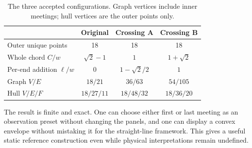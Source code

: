 \documentclass[11pt,a4paper]{article}
\begin{document}
\begin{table}[ht]\centering
\caption{The three accepted configurations. Graph vertices include inner meetings; hull vertices are the outer points only.}\label{tab:overview}
\begin{tabular}{@{}lccc@{}}\toprule
 & Original & Crossing A & Crossing B\\\midrule
Outer unique points &18&18&18\\
Whole chord $C/w$ &$\sqrt2-1$&$1$&$1+\sqrt2$\\
Per-end addition $\ell/w$ &$0$&$1-\sqrt2/2$&$1$\\
Graph $V/E$ &$18/21$&$36/63$&$54/105$\\
Hull $V/E/F$ &$18/27/11$&$18/48/32$&$18/36/20$\\\bottomrule
\end{tabular}
\end{table}
The result is finite and exact. One can choose either first or last meeting as an observation preset without changing the panels, and one can display a convex envelope without mistaking it for the straight-line framework. This gives a useful static reference construction even while physical interpretations remain undefined.
\end{document}
